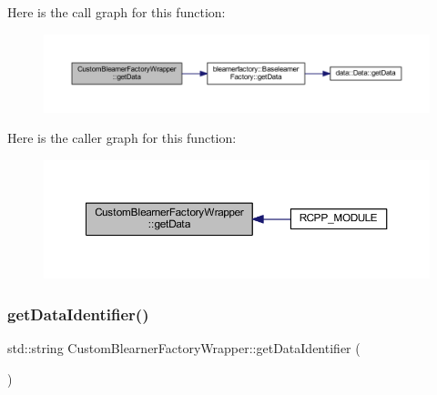 Here is the call graph for this function\+:
\nopagebreak
\begin{figure}[H]
\begin{center}
\leavevmode
\includegraphics[width=350pt]{class_custom_blearner_factory_wrapper_a70a976e3608e37e0740df932b227de60_cgraph}
\end{center}
\end{figure}
Here is the caller graph for this function\+:\nopagebreak
\begin{figure}[H]
\begin{center}
\leavevmode
\includegraphics[width=350pt]{class_custom_blearner_factory_wrapper_a70a976e3608e37e0740df932b227de60_icgraph}
\end{center}
\end{figure}
\mbox{\label{class_custom_blearner_factory_wrapper_a67eba4cecf4cbde07ce5dca73a909f0f}} 
\subsubsection{\texorpdfstring{get\+Data\+Identifier()}{getDataIdentifier()}}
{\footnotesize\ttfamily std\+::string Custom\+Blearner\+Factory\+Wrapper\+::get\+Data\+Identifier (\begin{DoxyParamCaption}{ }\end{DoxyParamCaption})\hspace{0.3cm}{\ttfamily [inline]}}

